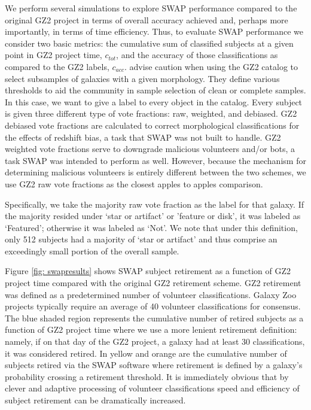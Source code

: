 \documentclass[twocolumn]{aastex6}
\begin{document}
We perform several simulations to explore SWAP performance compared to the
original GZ2 project in terms of overall accuracy achieved and, perhaps more importantly, 
in terms of time efficiency. Thus, to evaluate SWAP performance we consider two basic metrics:
the cumulative sum of classified subjects at a given point in GZ2 project time, $c_{tot}$, and the 
accuracy of those classifications as compared to the GZ2  labels, $c_{acc}$. \citep{Willett2013}
advise caution when using the GZ2 catalog to select subsamples of galaxies with a given
morphology.  They define various thresholds to aid the community in sample selection of
clean or complete samples. In this case, we want to give a label to every object in the catalog. 
Every subject is given three different type of vote fractions: raw, weighted, and debiased. 
GZ2 debiased vote fractions are calculated to correct morphological classifications for the
 effects of redshift bias, a task that SWAP was not built to handle. 
GZ2 weighted vote fractions serve to downgrade malicious volunteers and/or bots, a task
SWAP was intended to perform as well.  However, because the mechanism for
determining malicious volunteers is entirely different between the two schemes, we 
use GZ2 raw vote fractions as the closest apples to apples comparison. 

Specifically, we take the majority raw vote fraction as the label for that galaxy. If the 
majority resided under `star or artifact' or 'feature or disk', it was labeled as `Featured'; 
otherwise it was labeled as `Not'. We note that under this definition, only 512 subjects
had a majority of `star or artifact' and thus comprise an exceedingly small portion of the
overall sample. 

Figure \ref{fig: swapresults} shows SWAP subject retirement as a function of GZ2
project time compared with the original GZ2 retirement scheme. GZ2 retirement was 
defined as a predetermined number of volunteer classifications. Galaxy Zoo projects
typically require an average of 40 volunteer classifications for consensus. The blue
shaded region represents the cumulative number of retired subjects as a function
of GZ2 project time where we use a more lenient retirement definition: 
namely, if on that day of the GZ2 project, a galaxy had at least 30 classifications, 
it was considered retired. 
 In yellow and orange are the cumulative number of subjects retired
via the SWAP software where retirement is defined by a galaxy's probability
crossing a retirement threshold.  It is immediately obvious that by clever and adaptive 
processing of volunteer classifications speed and efficiency of subject retirement
can be dramatically increased. 
\end{document}
